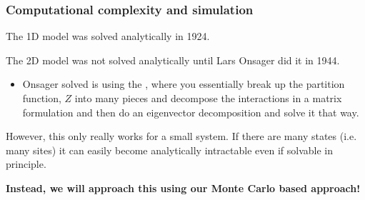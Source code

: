 \documentclass[hyperref={colorlinks=true}]{beamer}
\begin{document}
\begin{frame}%
  \frametitle{Computational complexity and simulation}
  
  The 1D model was solved analytically in 1924. 
  
  \vspace{0.3cm}
  
  The 2D model was not solved analytically until Lars Onsager did it in 1944. 
  \begin{itemize}
    \item Onsager solved is using the , where you essentially break up the partition function, $Z$ into many pieces and decompose the interactions in a matrix formulation and then do an eigenvector decomposition and solve it that way. 
  \end{itemize}
  
  \vspace{0.3cm}
  
  However, this only really works for a small system. If there are many states (i.e. many sites) it can easily become analytically intractable even if solvable in principle.
  
  \vspace{0.3cm}
  
  \begin{ucblock}{}
     \textbf{Instead, we will approach this using our Monte Carlo based approach!}
  \end{ucblock}
   
\end{frame}
\end{document}
